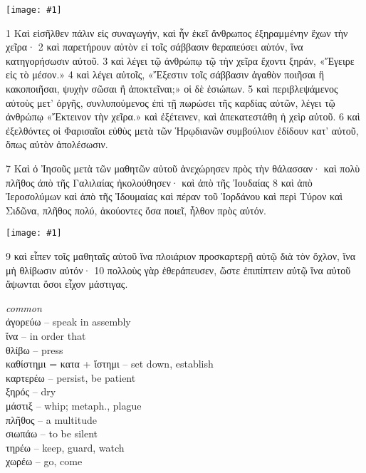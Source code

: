 \documentclass[10pt,a5paper,twoside,twocolumn]{book}
\newcommand{\newchapter}{\stepcounter{chapter}}
\newcommand{\fig}[1]{\texttt{[image: \#1]}\label{fig:#1}}
\newcommand*\cleartoleftpage{%
  \ifodd\value{page}\hbox{}\clearpage\fi
}
\newcommand{\sceneseparator}{%
  \vspace{-0.7\baselineskip}%
  \hspace{-0.01\textwidth}\noindent\makebox[\linewidth]{\resizebox{0.15\linewidth}{1pt}{$\bullet$}}%
  \vspace{-0.2\baselineskip}
}
\newenvironment{facing}{\cleartoleftpage}{\clearpage\pagebreak}
\newenvironment{help}{\clearpage}{}
\newenvironment{helpsec}{\begin{minipage}[t]{\textwidth}\begin{multicols}{2}}{\end{multicols}\end{minipage}}
\newenvironment{vocab}{\begin{helpsec}}{\end{helpsec}}
\begin{document}
\newchapter

\begin{facing}

\fig{03-01} %

1 Καὶ εἰσῆλθεν πάλιν εἰς συναγωγήν, καὶ ἦν ἐκεῖ ἄνθρωπος ἐξηραμμένην ἔχων τὴν χεῖρα· 2 καὶ παρετήρουν αὐτὸν εἰ τοῖς σάββασιν θεραπεύσει αὐτόν, ἵνα κατηγορήσωσιν αὐτοῦ. 
3 καὶ λέγει τῷ ἀνθρώπῳ τῷ τὴν χεῖρα ἔχοντι ξηράν, «Ἔγειρε εἰς τὸ μέσον.»
4 καὶ λέγει αὐτοῖς, «Ἔξεστιν τοῖς σάββασιν ἀγαθὸν ποιῆσαι ἢ κακοποιῆσαι, ψυχὴν σῶσαι ἢ ἀποκτεῖναι;» οἱ δὲ ἐσιώπων.
5 καὶ περιβλεψάμενος αὐτοὺς μετ’ ὀργῆς, συνλυπούμενος ἐπὶ τῇ πωρώσει τῆς καρδίας αὐτῶν, λέγει τῷ ἀνθρώπῳ «Ἔκτεινον τὴν χεῖρα.»
 καὶ ἐξέτεινεν, καὶ ἀπεκατεστάθη ἡ χεὶρ αὐτοῦ. 
6 καὶ ἐξελθόντες οἱ Φαρισαῖοι εὐθὺς μετὰ τῶν Ἡρῳδιανῶν συμβούλιον ἐδίδουν κατ’ αὐτοῦ, ὅπως αὐτὸν ἀπολέσωσιν. 	

\sceneseparator

7 Καὶ ὁ Ἰησοῦς μετὰ τῶν μαθητῶν αὐτοῦ ἀνεχώρησεν πρὸς τὴν θάλασσαν· καὶ πολὺ πλῆθος ἀπὸ τῆς Γαλιλαίας ἠκολούθησεν· καὶ ἀπὸ τῆς Ἰουδαίας 8 καὶ ἀπὸ Ἱεροσολύμων καὶ ἀπὸ τῆς Ἰδουμαίας καὶ πέραν τοῦ Ἰορδάνου καὶ περὶ Τύρον καὶ Σιδῶνα, πλῆθος πολύ, ἀκούοντες ὅσα ποιεῖ, ἦλθον πρὸς αὐτόν. 

\fig{03-09} %

9 καὶ εἶπεν τοῖς μαθηταῖς αὐτοῦ ἵνα πλοιάριον προσκαρτερῇ αὐτῷ διὰ τὸν ὄχλον, ἵνα μὴ θλίβωσιν αὐτόν· 10 πολλοὺς γὰρ ἐθεράπευσεν, ὥστε ἐπιπίπτειν αὐτῷ ἵνα αὐτοῦ ἅψωνται ὅσοι εἶχον μάστιγας. 

\begin{help}
\begin{vocab}
\emph{common}\\
ἀγορεύω -- speak in assembly\\
ἵνα -- in order that\\
θλίβω -- press\\
καθίστημι = κατα + ἵστημι -- set down, establish\\
καρτερέω -- persist, be patient\\
ξηρός -- dry\\
μάστιξ -- whip; metaph., plague\\
πλῆθος -- a multitude\\
σιωπάω -- to be silent\\
τηρέω -- keep, guard, watch\\
χωρέω -- go, come\\


\end{vocab}
\end{help}
\end{facing}
\end{document}
